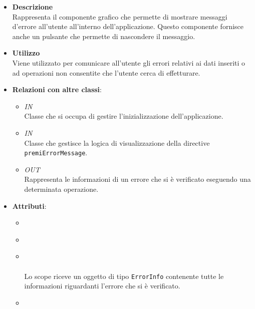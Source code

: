 \FloatBarrier
\begin{itemize}
\item \textbf{Descrizione}\\
Rappresenta il componente grafico che permette di mostrare messaggi d’errore all’utente all’interno dell’applicazione. Questo componente fornisce anche un pulsante che permette di nascondere il messaggio.
\item \textbf{Utilizzo}\\
Viene utilizzato per comunicare all’utente gli errori relativi ai dati inseriti o ad operazioni non consentite che l’utente cerca di effetturare.
\item \textbf{Relazioni con altre classi}:
\begin{itemize}
\item \textit{IN} \hyperref[\nogloxy{Premi::Front-End::AppRun}]{}\\
Classe che si occupa di gestire l'inizializzazione dell'applicazione.
\item \textit{IN} \hyperref[\nogloxy{Premi::Front-End::Controllers::ErrorMessageController}]{}\\
Classe che gestisce la logica di visualizzazione della directive \texttt{premiErrorMessage}.
\item \textit{OUT} \hyperref[\nogloxy{Premi::Front-End::Model::ErrorInfo}]{}\\
Rappresenta le informazioni di un errore che si è verificato eseguendo una determinata operazione.
\end{itemize}
\item \textbf{Attributi}:
\begin{itemize}
\item {}
\\ \dpDirectiveController
\item {}
\\ \dpRestrict
\item {}
\\ \dpIsolatedScope \\
Lo scope riceve un oggetto di tipo \texttt{ErrorInfo} contenente tutte le informazioni riguardanti l'errore che si è verificato.
\item {}
\\ \dpTemplateUrl
\end{itemize}
\end{itemize}
